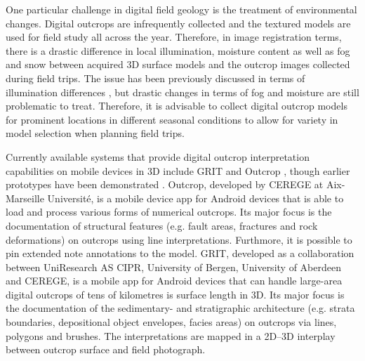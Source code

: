 \documentclass[review]{elsarticle}
\begin{document}
One particular challenge in digital field geology is the treatment of environmental changes. Digital outcrops are infrequently collected and the textured models are used for field study all across the year. Therefore, in image registration terms, there is a drastic difference in local illumination, moisture content as well as fog and snow between acquired 3D surface models and the outcrop images collected during field trips. The issue has been previously discussed in terms of illumination differences \cite{Kehl2017_PHOR}, but drastic changes in terms of fog and moisture are still problematic to treat. Therefore, it is advisable to collect digital outcrop models for prominent locations in different seasonal conditions to allow for variety in model selection when planning field trips.

Currently available systems that provide digital outcrop interpretation capabilities on mobile devices in 3D include \gls{GRIT} \cite{Kehl2016_VGCabstract} and Outcrop \cite{Viseur2014_VGCabstract}, though earlier prototypes have been demonstrated \cite{Hama2013}. Outcrop, developed by \gls{CEREGE} at Aix-Marseille Universit\'{e}, is a mobile device app for Android devices that is able to load and process various forms of numerical outcrops. Its major focus is the documentation of structural features (e.g. fault areas, fractures and rock deformations) on outcrops using line interpretations. Furthmore, it is possible to pin extended note annotations to the model. \gls{GRIT}, developed as a collaboration between UniResearch AS CIPR, University of Bergen, University of Aberdeen and \gls{CEREGE}, is a mobile app for Android devices that can handle large-area digital outcrops of tens of kilometres is surface length in 3D. Its major focus is the documentation of the sedimentary- and stratigraphic architecture (e.g. strata boundaries, depositional object envelopes, facies areas) on outcrops via lines, polygons and brushes. The interpretations are mapped in a 2D--3D interplay between outcrop surface and field photograph.
\end{document}
